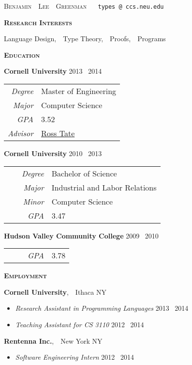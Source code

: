 \documentclass{article}
\makeatletter
\renewcommand{\maketitle}{
\hspace{-1.4cm} \textsc{Benjamin~~Lee~~Greenman}
~\hfill~
\texttt{\fontseries{m}types\,@\,ccs.neu.edu}
}
\newcommand{\mysection}[1]{\vspace{0.5cm}
\hspace{-1.3cm}\textsc{\textbf{#1}}~\hrulefill}
\makeatother
\begin{document}
\maketitle


\mysection{Research Interests}

Language Design,~~Type Theory,~~Proofs,~~Programs

\mysection{Education}

\textbf{Cornell University} \hfill 2013 \textendash\ 2014 \\
\begin{tabular}{>{\it}r l}
Degree & Master of Engineering\\
Major & Computer Science\\
GPA & 3.52\\
Advisor & \href{http://www.cs.cornell.edu/~ross/}{Ross Tate}
\end{tabular}

\textbf{Cornell University} \hfill 2010 \textendash\ 2013\\
\begin{tabular}{>{\it}r l}
Degree & Bachelor of Science\\
Major & Industrial and Labor Relations\\
Minor & Computer Science\\
~~~~~GPA & 3.47\\
\end{tabular}

\textbf{Hudson Valley Community College} \hfill 2009 \textendash\ 2010 \\ 
\begin{tabular}{>{\it}r l}
~~~~~GPA & 3.78\\
\end{tabular}

\mysection{Employment}

\textbf{Cornell University},~~Ithaca NY
\begin{itemize}[topsep=-0.2cm,itemsep=0.1cm]
\item \emph{Research Assistant in Programming Languages} \hfill 2013 \textendash\ 2014
\item \emph{Teaching Assistant for CS 3110} \hfill 2012 \textendash\ 2014
\end{itemize}

\textbf{Rentenna Inc.},~~New York NY
\begin{itemize}[topsep=-0.2cm,itemsep=0.1cm]
\item \emph{Software Engineering Intern} \hfill 2012 \textendash\ 2014
\end{itemize}
\end{document}
